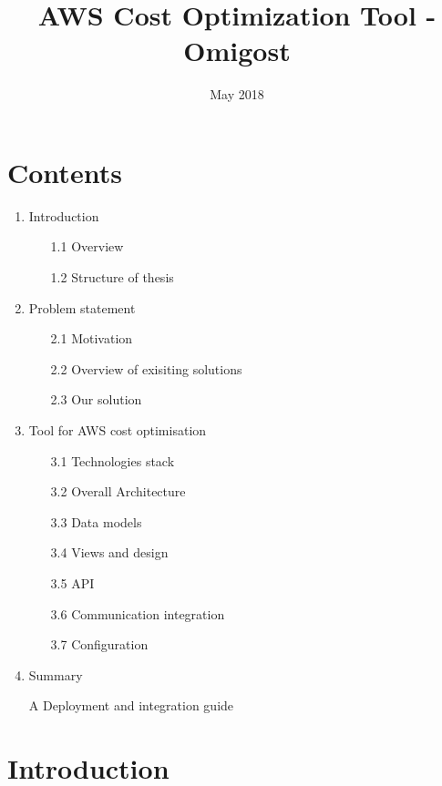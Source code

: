 \documentclass[licencjacka,en]{thesisclass}
\title{AWS Cost Optimization Tool - Omigost}
\date{May 2018}
\begin{document}
\maketitle

\begin{abstract}
  
\end{abstract}

\chapter*{Contents}

\begin{enumerate}
    \item Introduction
        \begin{enumerate}
            \item [1.1] Overview
            \item [1.2] Structure of thesis 
        \end{enumerate}
    \item Problem statement
        \begin{enumerate}
            \item [2.1] Motivation
            \item [2.2] Overview of exisiting solutions
            \item [2.3] Our solution
        \end{enumerate}
    \item Tool for AWS cost optimisation
        \begin{enumerate}
            \item [3.1] Technologies stack
            \item [3.2] Overall Architecture
            \item [3.3] Data models
            \item [3.4] Views and design
            \item [3.5] API
            \item [3.6] Communication integration
            \item [3.7] Configuration
        \end{enumerate}
    \item Summary
    \item [A] Deployment and integration guide
\end{enumerate}

\chapter{Introduction}
\end{document}
